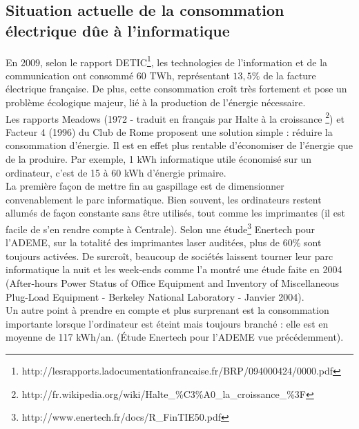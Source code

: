 \documentclass[a4paper,11pt,french]{article}
\begin{document}
\subsection{Situation actuelle de la consommation électrique dûe à l'informatique}
En 2009, selon le rapport DETIC\footnote{\textsf{http://lesrapports.ladocumentationfrancaise.fr/BRP/094000424/0000.pdf}}, les technologies de l’information et de la communication ont consommé 60 TWh, représentant $13,5\%$ de la facture électrique française. De plus, cette consommation croît très fortement et pose un problème écologique majeur, lié à la production de l’énergie nécessaire.\\

Les rapports Meadows (1972 - traduit en français par \og Halte à la croissance \fg \footnote{\textsf{http://fr.wikipedia.org/wiki/Halte\_{}\%C3\%A0\_{}la\_{}croissance\_{}\%3F}}) et Facteur 4 (1996) du Club de Rome proposent une solution simple : réduire la consommation d’énergie. Il est en effet plus rentable d’économiser de l’énergie que de la produire. Par exemple, 1 kWh informatique utile économisé sur un ordinateur, c’est de 15 à 60 kWh d’énergie primaire.\\

La première façon de mettre fin au gaspillage est de dimensionner convenablement le parc informatique. Bien souvent, les ordinateurs restent allumés de façon constante sans être utilisés, tout comme les imprimantes (il est facile de s’en rendre compte à Centrale). Selon une étude\footnote{\textsf{http://www.enertech.fr/docs/R\_{}FinTIE50.pdf}} Enertech pour l’ADEME, sur la totalité des imprimantes laser auditées, plus de $60\%$ sont toujours activées. De surcroît, beaucoup de sociétés laissent tourner leur parc informatique la nuit et les week-ends comme l’a montré une étude faite en 2004 (After-hours Power Status of Office Equipment and Inventory of Miscellaneous Plug-Load Equipment - Berkeley National Laboratory - Janvier 2004).\\

Un autre point à prendre en compte et plus surprenant est la consommation importante lorsque l’ordinateur est éteint mais toujours branché : elle est en moyenne de 117 kWh/an. (Étude Enertech pour l’ADEME vue précédemment).
\end{document}

